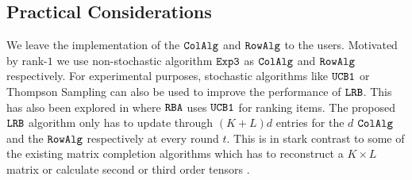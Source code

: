 \subsection{Practical Considerations}
\label{sec:practical considerations}




We leave the implementation of the ${\tt ColAlg}$ and ${\tt RowAlg}$ to the users.  Motivated by rank-$1$ we use non-stochastic algorithm ${\tt Exp3}$ as ${\tt ColAlg}$ and ${\tt RowAlg}$ respectively. For experimental purposes, stochastic algorithms like ${\tt UCB1}$ or Thompson Sampling can also be used to improve the performance of ${\tt LRB}$. This has also been explored in \citet{radlinski2008learning} where ${\tt RBA}$ uses ${\tt UCB1}$ for ranking items. The proposed ${\tt LRB}$ algorithm only has to update through $(K + L)d$ entries for the $d$ ${\tt ColAlg}$ and the ${\tt RowAlg}$ respectively at every round $t$. This is in stark contrast to some of the existing matrix completion algorithms which has to reconstruct a $K\times L$ matrix \citep{sen2016contextual} or calculate second or third order tensors \citep{gopalan2016low}. 

